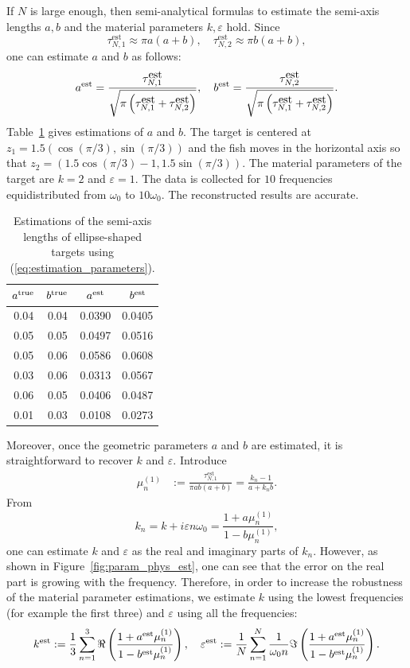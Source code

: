 \documentclass[final]{siamltex}
\numberwithin{equation}{section}
\numberwithin{figure}{section}
\numberwithin{table}{section}
\begin{document}
If $N$ is large enough, then semi-analytical formulas to estimate
the semi-axis lengths $a,b$ and the material parameters $k,
\varepsilon$ hold. Since
$$ \tau_{N,1}^{\mbox {est}} \approx \pi a(a+b),\quad  \tau_{N,2}^{\mbox {est}} \approx \pi
b(a+b),$$ one can estimate $a$ and $b$ as follows:
\begin{equation}
a^{\rm est}  =\frac{\tau_{N,1}^{\mbox
{est}}}{\sqrt{\pi\left(\tau_{N,1}^{\mbox {est}} +\tau_{N,2}^{\mbox
{est}}\right)}},\quad  b^{\rm est}  =\frac{\tau_{N,2}^{\mbox
{est}}}{\sqrt{\pi\left(\tau_{N,1}^{\mbox {est}}+\tau_{N,2}^{\mbox
{est}}\right)}}. \label{eq:estimation_parameters}
\end{equation}
Table~\ref{tab:characteriaztion_geometric_parameters} gives
 estimations of $a$ and $b$. The target is centered at $z_{1}=1.5(\cos(\pi/3),\sin(\pi/3))$
and the fish moves in the horizontal axis so that
$z_{2}=(1.5\cos(\pi/3)-1,1.5\sin(\pi/3))$. The material parameters
of the target are $k=2$ and $\varepsilon=1$.  The data is
collected for $10$ frequencies equidistributed from $\omega_0$ to
$10 \omega_0$. The reconstructed results are accurate.

\begin{table}[!h]
\centering%
\begin{tabular}{|c|c||c|c|}
\hline $a^{\rm true}$ & $b^{\rm true}$ & $a^{\rm est}$ & $b^{\rm
est}$\tabularnewline \hline \hline 0.04 & 0.04 & 0.0390 &
0.0405\tabularnewline \hline 0.05 & 0.05 & 0.0497 &
0.0516\tabularnewline \hline 0.05 & 0.06 & 0.0586 &
0.0608\tabularnewline \hline \hline 0.03 & 0.06 & 0.0313 &
0.0567\tabularnewline \hline 0.06 & 0.05 & 0.0406 &
0.0487\tabularnewline \hline 0.01 & 0.03 & 0.0108 &
0.0273\tabularnewline \hline
\end{tabular}
\caption{Estimations of the semi-axis lengths of ellipse-shaped
targets using
(\ref{eq:estimation_parameters}).\label{tab:characteriaztion_geometric_parameters}}
\end{table}

Moreover, once the geometric parameters $a$ and $b$ are estimated,
it is straightforward to recover $k$ and $\varepsilon$. Introduce
\[
\begin{alignedat}{1}\mu_{n}^{(1)} & :=\frac{\tau_{N,1}^{\mbox {est}}}{\pi ab(a+b)}=\frac{k_{n}-1}{a+k_{n}b}.\end{alignedat}
\]
From
\[
k_{n} = k+ i \varepsilon n \omega_0 =
\frac{1+a\mu_{n}^{(1)}}{1-b\mu_{n}^{(1)}},
\]
one can estimate $k$ and $\varepsilon$ as the real and imaginary
parts of $k_n$. However, as shown in
Figure~\ref{fig:param_phys_est}, one can see that the error on the
real part is growing with the frequency. Therefore, in order to
increase the robustness of the material parameter estimations, we
estimate $k$ using the lowest frequencies (for example the first
three) and $\varepsilon$ using all the frequencies:
\begin{equation}
k^{\rm est} :=\frac{1}{3}\sum_{n=1}^{3}\Re\left(\frac{1+a^{\rm
est}\mu_{n}^{(1)}}{1-b^{\rm est}\mu_{n}^{(1)}}\right),\quad
\varepsilon^{\rm est}
:=\frac{1}{N}\sum_{n=1}^{N}\frac{1}{\omega_{0}n}\Im\left(\frac{1+a^{\rm
est}\mu_{n}^{(1)}}{1-b^{\rm est}\mu_{n}^{(1)}}\right).
\label{eq:phys_param_est}
\end{equation}
\end{document}
